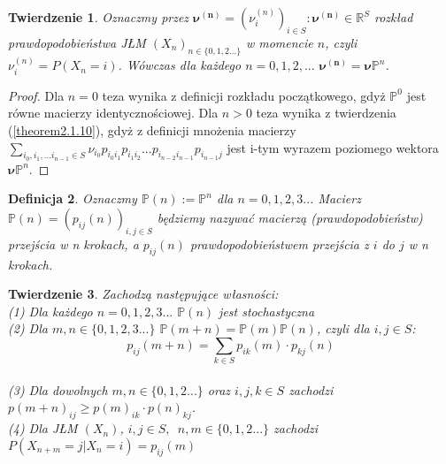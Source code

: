 \documentclass[a4paper]{article}
\theoremstyle{defn}
\newtheorem{defn}{Definicja}[subsection]
\theoremstyle{theorem}
\newtheorem{theorem}[defn]{Twierdzenie}
\theoremstyle{lemma}
\theoremstyle{cor}
\theoremstyle{fact}
\begin{document}
\begin{theorem}\label{theorem2.1.11}
Oznaczmy przez $\boldsymbol{\nu^{(n)}} = (\nu_i^{(n)})_{i \in S}: \boldsymbol{\nu^{(n)}} \in \mathbb{R}^S$ rozkład prawdopodobieństwa JŁM $(X_n)_{n \in \{0,1,2...\}}$ w momencie $n$, czyli $\nu^{(n)}_i = P(X_n = i)$. Wówczas dla każdego $n= 0,1,2,...$ $\boldsymbol{\nu^{(n)}} = \boldsymbol{\nu} \mathbb{P}^n$.
\end{theorem}
\begin{proof}
Dla $n=0$ teza wynika z definicji rozkładu początkowego, gdyż $\mathbb{P}^0$ jest równe macierzy identycznościowej. Dla $n>0$ teza wynika z twierdzenia (\ref{theorem2.1.10}), gdyż z definicji mnożenia macierzy $\sum\limits_{i_0, i_1,... i_{n-1} \in S} \nu_{i_0} p_{i_{0}i_{1}} p_{i_{1}i_{2}} ... p_{i_{n-2}i_{n-1}}p_{i_{n-1}j}$ jest i-tym wyrazem poziomego wektora $\boldsymbol{\nu} \mathbb{P}^n$.
\end{proof}
\begin{defn}\label{defn2.1.12}
Oznaczmy $\mathbb{P}(n) := \mathbb{P}^n$ dla $n=0,1,2,3..$. Macierz $\mathbb{P}(n) = (p_{ij}(n))_{i, j \in S}$ będziemy nazywać \textit{macierzą (prawdopodobieństw) przejścia w n krokach}, a $p_{ij}(n)$ \textit{prawdopodobieństwem przejścia z $i$ do $j$ w n krokach}.
\end{defn}
\begin{theorem}\label{theorem2.1.13} Zachodzą następujące własności:
\\(1) Dla każdego $n=0,1,2,3...$ $\mathbb{P}(n)$ jest stochastyczna
\\(2) Dla $m,n \in \{0,1,2,3...\}$ $\mathbb{P}(m+n) = \mathbb{P}(m)\mathbb{P}(n)$, czyli dla $i,j \in S$: $$p_{ij}(m+n) = \sum\limits_{k \in S} p_{ik}(m) \cdot p_{kj}(n)$$
\\(3) Dla dowolnych $m,n \in \{0,1,2...\}$ oraz $i,j,k \in S$ zachodzi $p(m+n)_{ij} \geq p(m)_{ik}\cdot p(n)_{kj}$.
\\(4) Dla JŁM $(X_n)$, $i,j \in S,$ $\, n,m \in \{0,1,2...\}$ zachodzi $P(X_{n+m} = j|X_n = i) = p_{ij}(m)$
\end{theorem}
\end{document}
